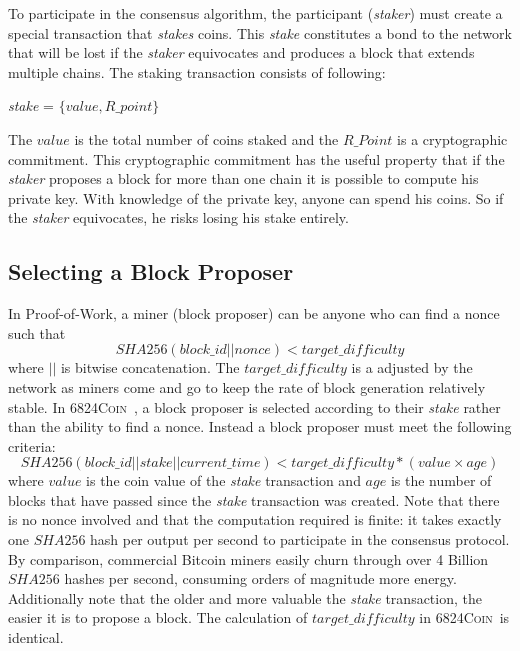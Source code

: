 \documentclass{article}
\newcommand{\coin}{ \textsc{6824Coin}\ }
\begin{document}
To participate in the consensus algorithm, the participant (\textit{staker}) must create a special transaction that \textit{stakes} coins. This \textit{stake} constitutes a bond to the network that will be lost if the \textit{staker} equivocates and produces a block that extends multiple chains. The staking transaction consists of following:
\begin{center}
\textit{stake} = $\{value, R\_point\}$
\end{center}
The $value$ is the total number of coins staked and the $R\_Point$ is a cryptographic commitment. This cryptographic commitment has the useful property that if the \textit{staker} proposes a block for more than one chain it is possible to compute his private key. With knowledge of the private key, anyone can spend his coins. So if the \textit{staker} equivocates, he risks losing his stake entirely.

\subsection{Selecting a Block Proposer}
In Proof-of-Work, a miner (block proposer) can be anyone who can find a nonce such that 
$$SHA256(block\_id || nonce) < target\_difficulty$$
where $||$ is bitwise concatenation. The $target\_difficulty$ is a adjusted by the network as miners come and go to keep the rate of block generation relatively stable. 
In \coin, a block proposer is selected according to their \textit{stake} rather than the ability to find a nonce. Instead a block proposer must meet the following criteria:  
$$SHA256(block\_id || stake || current\_time) < target\_difficulty * (value \times age) $$ 
where $value$ is the coin value of the \textit{stake} transaction and $age$ is the number of blocks that have passed since the \textit{stake} transaction was created. Note that there is no nonce involved and that the computation required is finite: it takes exactly one $SHA256$ hash per output per second to participate in the consensus protocol. By comparison, commercial Bitcoin miners easily churn through over 4 Billion $SHA256$ hashes per second, consuming orders of magnitude more energy. Additionally note that the older and more valuable the \textit{stake} transaction, the easier it is to propose a block. The calculation of $target\_difficulty$ in \coin is identical. 
\end{document}
